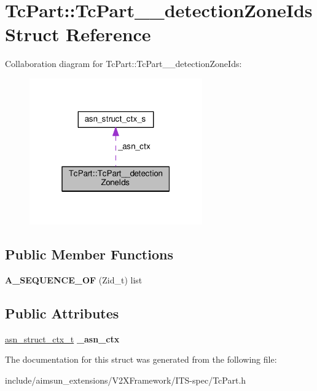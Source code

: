 \hypertarget{structTcPart_1_1TcPart____detectionZoneIds}{}\section{Tc\+Part\+:\+:Tc\+Part\+\_\+\+\_\+detection\+Zone\+Ids Struct Reference}
\label{structTcPart_1_1TcPart____detectionZoneIds}


Collaboration diagram for Tc\+Part\+:\+:Tc\+Part\+\_\+\+\_\+detection\+Zone\+Ids\+:\nopagebreak
\begin{figure}[H]
\begin{center}
\leavevmode
\includegraphics[width=211pt]{structTcPart_1_1TcPart____detectionZoneIds__coll__graph}
\end{center}
\end{figure}
\subsection*{Public Member Functions}
\begin{DoxyCompactItemize}
\item 
{\bfseries A\+\_\+\+S\+E\+Q\+U\+E\+N\+C\+E\+\_\+\+OF} (Zid\+\_\+t) list\hypertarget{structTcPart_1_1TcPart____detectionZoneIds_a40e611c16d15a30f55d162e013250426}{}\label{structTcPart_1_1TcPart____detectionZoneIds_a40e611c16d15a30f55d162e013250426}

\end{DoxyCompactItemize}
\subsection*{Public Attributes}
\begin{DoxyCompactItemize}
\item 
\hyperlink{structasn__struct__ctx__s}{asn\+\_\+struct\+\_\+ctx\+\_\+t} {\bfseries \+\_\+asn\+\_\+ctx}\hypertarget{structTcPart_1_1TcPart____detectionZoneIds_a11008f0adfef41ed88e35f18c77b42c9}{}\label{structTcPart_1_1TcPart____detectionZoneIds_a11008f0adfef41ed88e35f18c77b42c9}

\end{DoxyCompactItemize}


The documentation for this struct was generated from the following file\+:\begin{DoxyCompactItemize}
\item 
include/aimsun\+\_\+extensions/\+V2\+X\+Framework/\+I\+T\+S-\/spec/Tc\+Part.\+h\end{DoxyCompactItemize}

